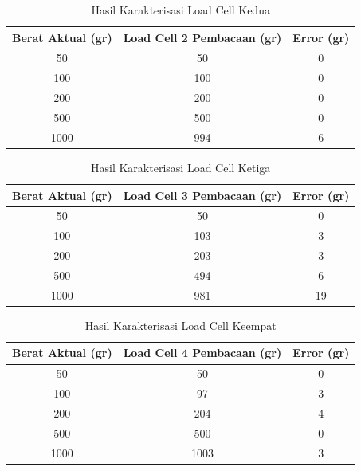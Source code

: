 \begin{enumerate}[label=\Alph*.]
        \begin{table}[h]
            \centering
            \caption{Hasil Karakterisasi Load Cell Kedua}
            \begin{tabular}{|c|c|c|}
                \hline
                \textbf{Berat Aktual (gr)} & \textbf{Load Cell 2 Pembacaan (gr)} & \textbf{Error (gr)} \\
                \hline
                50        & 50        & 0   \\
                100       & 100       & 0   \\
                200       & 200       & 0   \\
                500       & 500       & 0   \\
                1000      & 994       & 6   \\           
                \hline
        \end{tabular}
        \label{tab:Kalibrasi_Load_Cell_2}
        \end{table}

        \begin{table}[h]
            \centering
            \caption{Hasil Karakterisasi Load Cell Ketiga}
            \begin{tabular}{|c|c|c|}
                \hline
                \textbf{Berat Aktual (gr)} & \textbf{Load Cell 3 Pembacaan (gr)} & \textbf{Error (gr)} \\
                \hline
                50        & 50        & 0    \\    
                100       & 103       & 3    \\    
                200       & 203       & 3    \\    
                500       & 494       & 6    \\    
                1000      & 981       & 19   \\               
                \hline
        \end{tabular}
        \label{tab:Kalibrasi_Load_Cell_3}
        \end{table}

        \begin{table}[h]
            \centering
            \caption{Hasil Karakterisasi Load Cell Keempat}
            \begin{tabular}{|c|c|c|}
                \hline
                \textbf{Berat Aktual (gr)} & \textbf{Load Cell 4 Pembacaan (gr)} & \textbf{Error (gr)} \\
                \hline
                50        & 50        & 0   \\     
                100       & 97        & 3   \\     
                200       & 204       & 4   \\     
                500       & 500       & 0   \\     
                1000      & 1003      & 3   \\                
                \hline
        \end{tabular}
        \label{tab:Kalibrasi_Load_Cell_4}
        \end{table}
    

\end{enumerate}
